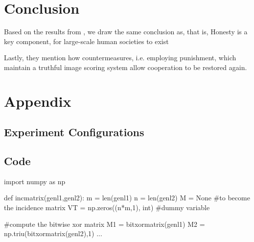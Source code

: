 \documentclass[sigconf]{acmart}
\newcommand{\todo}[1]{{\color{red}{#1}}}
\begin{document}
    \section{Conclusion}\label{sec:conclusion}
    \todo{discussion}
    Based on the results from , we draw the same conclusion as, that is,
    Honesty is a key component, for large-scale human societies to exist

    Lastly, they mention how countermeasures, i.e. employing punishment, which maintain a truthful image scoring system allow cooperation to be restored again. \cite{szamado_deception_2016}
    \todo{refer to hypothesis q}




    
    

    \clearpage

    \onecolumn
    \section*{Appendix}

    \subsection{Experiment Configurations}\label{sec:configs}

    \subsection{Code}\label{sec:code}
    \begin{python}
        import numpy as np

        def incmatrix(genl1,genl2):
        m = len(genl1)
        n = len(genl2)
        M = None #to become the incidence matrix
        VT = np.zeros((n*m,1), int)  #dummy variable

        #compute the bitwise xor matrix
        M1 = bitxormatrix(genl1)
        M2 = np.triu(bitxormatrix(genl2),1)
        ...
    \end{python}
    \todo{add code and config}
    \todo{quick little readme}
\end{document}
